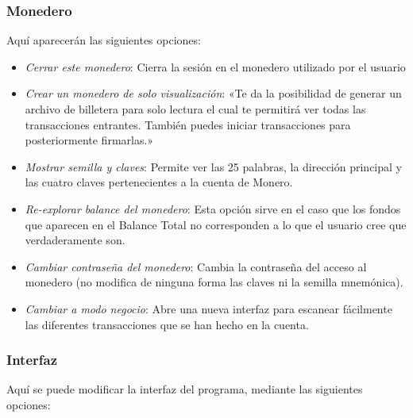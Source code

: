 \documentclass[12pt,a4paper,twoside]{book}
\begin{document}
\subsubsection{Monedero}
Aquí aparecerán las siguientes opciones:

\begin{itemize}
\item \textit{Cerrar este monedero}: Cierra la sesión en el monedero utilizado por el usuario
\item \textit{Crear un monedero de solo visualización}: «Te da la posibilidad de generar un archivo de billetera para solo lectura el cual te permitirá ver todas las transacciones entrantes. También puedes iniciar transacciones para posteriormente firmarlas.» \cite[\# 11]{satoshilov}
\item \textit{Mostrar semilla y claves}: Permite ver las 25 palabras, la dirección principal y las cuatro claves pertenecientes a la cuenta de Monero.
\item \textit{Re-explorar balance del monedero}: Esta opción sirve en el caso que los fondos que aparecen en el Balance Total no corresponden a lo que el usuario cree que verdaderamente son.
\item \textit{Cambiar contraseña del monedero}: Cambia la contraseña del acceso al monedero (no modifica de ninguna forma las claves ni la semilla mnemónica).
\item \textit{Cambiar a modo negocio}: Abre una nueva interfaz para escanear fácilmente las diferentes transacciones que se han hecho en la cuenta.
\end{itemize}

\subsubsection{Interfaz}
Aquí se puede modificar la interfaz del programa, mediante las siguientes opciones:
\end{document}
